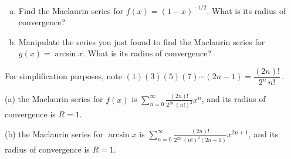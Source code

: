 \begin{Mquestion}
	\begin{enumerate}[(a)]
		\item Find the Maclaurin series for $f(x) = (1-x)^{-1/2}$. What is its radius of convergence?
		\item Manipulate the  series you just found to find the Maclaurin series for $g(x)=\arcsin x$. What is its radius of convergence?
	\end{enumerate}
\end{Mquestion}
\begin{hint}
For simplification purposes, note
$\displaystyle(1)(3)(5)(7)\cdots(2n-1)=\dfrac{(2n)!}{2^n \,n!}$\,.
\end{hint}
\begin{answer}
	(a) the Maclaurin series for $f(x)$ is $\displaystyle \sum_{n=0}^\infty\frac{(2n)!}{2^{2n}\,(n!)^2}x^n$, and its radius of convergence is $R=1$.

	(b) the Maclaurin series for $\arcsin x$ is $\displaystyle\sum_{n=0}^\infty\frac{(2n)!}{2^{2n}\,(n!)^2(2n+1)}x^{2n+1}$, and its radius of convergence is $R=1$.
\end{answer}
